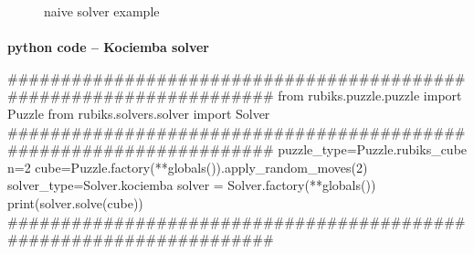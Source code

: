 \begin{figure}[H]
  \noindent
  \caption[Examples]{naive solver example}
  \label{fig:examplenaivesolver}
\end{figure}





\afblue
\paragraph{}{\textbf{python code -- Kociemba solver}}
\begin{python}
####################################################################
from rubiks.puzzle.puzzle import Puzzle
from rubiks.solvers.solver import Solver
####################################################################
puzzle_type=Puzzle.rubiks_cube
n=2
cube=Puzzle.factory(**globals()).apply_random_moves(2)
solver_type=Solver.kociemba
solver = Solver.factory(**globals())
print(solver.solve(cube))
####################################################################

\end{python}
\black


